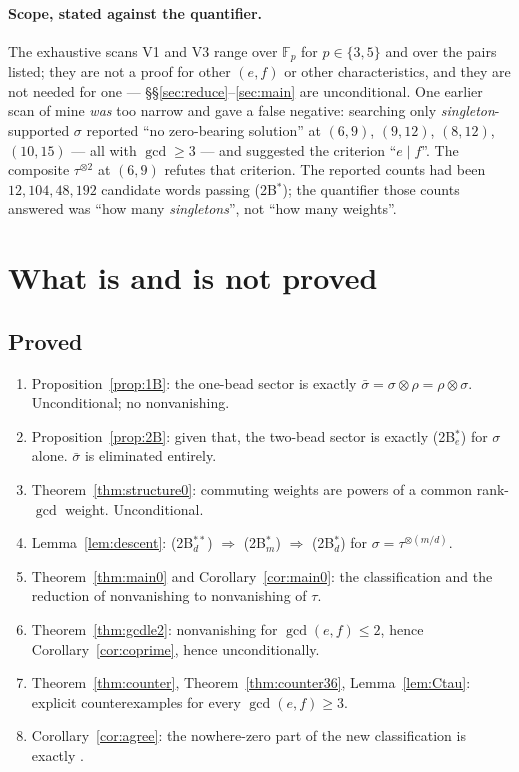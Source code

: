 \documentclass[11pt]{article}
\theoremstyle{definition}
\theoremstyle{remark}
\newcommand{\F}{\mathbb{F}}
\begin{document}
\paragraph{Scope, stated against the quantifier.}  The exhaustive scans V1 and V3 range over
$\F_p$ for $p\in\{3,5\}$ and over the pairs listed; they are not a proof for other $(e,f)$
or other characteristics, and they are not needed for one --- §§\ref{sec:reduce}--\ref{sec:main}
are unconditional.  One earlier scan of mine \emph{was} too narrow and gave a false
negative: searching only \emph{singleton}-supported $\sigma$ reported ``no zero-bearing
solution'' at $(6,9)$, $(9,12)$, $(8,12)$, $(10,15)$ --- all with $\gcd\ge3$ --- and
suggested the criterion ``$e\mid f$''.  The composite $\tau^{\otimes2}$ at $(6,9)$ refutes
that criterion.  The reported counts had been $12,104,48,192$ candidate words passing
(2B$^*$); the quantifier those counts answered was ``how many \emph{singletons}'', not ``how
many weights''.

\section{What is and is not proved}\label{sec:gaps}

\subsection*{Proved}
\begin{enumerate}
\item Proposition~\ref{prop:1B}: the one-bead sector is exactly
  $\bar\sigma=\sigma\otimes\rho=\rho\otimes\sigma$.  Unconditional; no nonvanishing.
\item Proposition~\ref{prop:2B}: given that, the two-bead sector is exactly (2B$^*_e$) for
  $\sigma$ alone.  $\bar\sigma$ is eliminated entirely.
\item Theorem~\ref{thm:structure0}: commuting weights are powers of a common rank-$\gcd$
  weight.  Unconditional.
\item Lemma~\ref{lem:descent}: (2B$^{**}_d$) $\Rightarrow$ (2B$^{*}_m$) $\Rightarrow$
  (2B$^{*}_d$) for $\sigma=\tau^{\otimes(m/d)}$.
\item Theorem~\ref{thm:main0} and Corollary~\ref{cor:main0}: the classification and the
  reduction of nonvanishing to nonvanishing of $\tau$.
\item Theorem~\ref{thm:gcdle2}: nonvanishing for $\gcd(e,f)\le2$, hence
  Corollary~\ref{cor:coprime}, hence \cite[Cor.~5.3, Prop.~8.5]{Q149} unconditionally.
\item Theorem~\ref{thm:counter}, Theorem~\ref{thm:counter36}, Lemma~\ref{lem:Ctau}:
  explicit counterexamples for every $\gcd(e,f)\ge3$.
\item Corollary~\ref{cor:agree}: the nowhere-zero part of the new classification is exactly
  \cite[Thm.~5.2(c)]{Q149}.
\end{enumerate}
\end{document}
